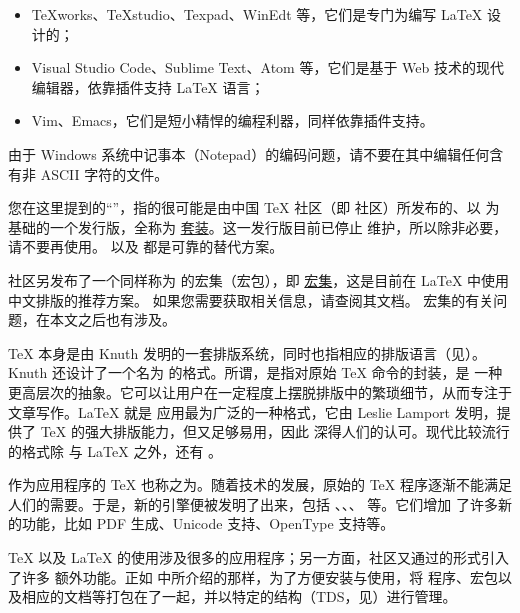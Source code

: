 \begin{itemize}
  \item TeXworks、TeXstudio、Texpad、WinEdt 等，它们是专门为编写 \LaTeX{} 设计的；
  \item Visual Studio Code、Sublime Text、Atom 等，它们是基于 Web 技术的现代编辑器，依靠插件支持
    \LaTeX{} 语言；
  \item Vim、Emacs，它们是短小精悍的编程利器，同样依靠插件支持。
\end{itemize}

\begin{note}
  由于 Windows 系统中记事本（Notepad）的编码问题，请不要在其中编辑任何含有非 ASCII 字符的文件。
\end{note}



您在这里提到的“\CTeX{}”，指的很可能是由中国 \TeX{} 社区（即 \CTeX{} 社区）所发布的、以 \MiKTeX{}
为基础的一个发行版，全称为 \href{http://www.ctex.org/CTeX}{\CTeX{} 套装}。这一发行版目前已停止
维护，所以除非必要，请不要再使用。\TeXLive{} 以及 \MiKTeX{} 都是可靠的替代方案。

\CTeX{} 社区另发布了一个同样称为 \CTeX{} 的宏集（宏包），即
\href{https://www.ctan.org/pkg/ctex}{\CTeX{} 宏集}，这是目前在 \LaTeX{} 中使用中文排版的推荐方案。
如果您需要获取相关信息，请查阅其文档。\CTeX{} 宏集的有关问题，在本文之后也有涉及。



\TeX{} 本身是由 Knuth 发明的一套排版系统，同时也指相应的排版语言（见）。
Knuth 还设计了一个名为 \PlainTeX{} 的格式。所谓，是指对原始 \TeX{} 命令的封装，是
一种更高层次的抽象。它可以让用户在一定程度上摆脱排版中的繁琐细节，从而专注于文章写作。\LaTeX{} 就是
应用最为广泛的一种格式，它由 Leslie Lamport 发明，提供了 \TeX{} 的强大排版能力，但又足够易用，因此
深得人们的认可。现代比较流行的格式除 \PlainTeX{} 与 \LaTeX{} 之外，还有 \ConTeXt{}。

作为应用程序的 \TeX{} 也称之为。随着技术的发展，原始的 \TeX{} 程序逐渐不能满足
人们的需要。于是，新的引擎便被发明了出来，包括 \eTeX{}、\pdfTeX{}、\XeTeX{}、\LuaTeX{} 等。它们增加
了许多新的功能，比如 PDF 生成、Unicode 支持、OpenType 支持等。

\TeX{} 以及 \LaTeX{} 的使用涉及很多的应用程序；另一方面，社区又通过的形式引入了许多
额外功能。正如 中所介绍的那样，为了方便安装与使用，将
程序、宏包以及相应的文档等打包在了一起，并以特定的结构（TDS，见）进行管理。

